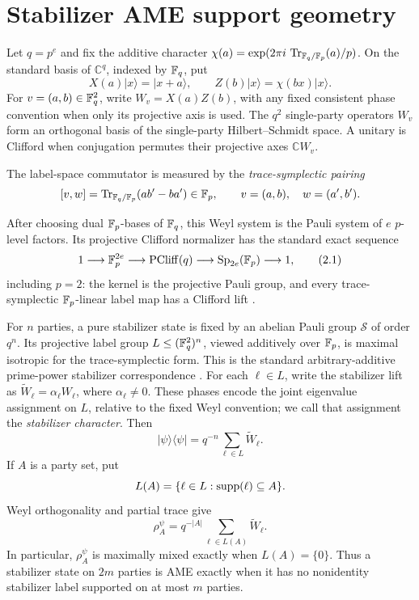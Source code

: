 \section{Stabilizer AME support geometry}\label{sec:dictionary}

Let \(q=p^e\) and fix the additive character
\(\chi(a)=\exp(2\pi i\,\operatorname{Tr}_{\mathbb F_q/\mathbb F_p}(a)/p)\).  On the standard basis of
\(\mathbb C^q\), indexed by \(\mathbb F_q\), put
\[
 X(a)\lvert x\rangle=\lvert x+a\rangle,\qquad
 Z(b)\lvert x\rangle=\chi(bx)\lvert x\rangle .
\]
For \(v=(a,b)\in\mathbb F_q^2\), write \(W_v=X(a)Z(b)\), with any fixed
consistent phase convention when only its projective axis is used.  The
\(q^2\) single-party operators \(W_v\) form an
orthogonal basis of the single-party Hilbert--Schmidt space.  A unitary is
Clifford when conjugation permutes their projective axes
\(\mathbb C W_v\).

The label-space commutator is measured by the \emph{trace-symplectic
pairing}
\[
 [v,w]=\operatorname{Tr}_{\mathbb F_q/\mathbb F_p}(ab'-ba')\in\mathbb F_p,
 \qquad v=(a,b),\quad w=(a',b').
\]

After choosing dual \(\mathbb F_p\)-bases of \(\mathbb F_q\), this Weyl system is the
Pauli system of \(e\) \(p\)-level factors.  Its projective Clifford
normalizer has the standard exact sequence
\[
 1\longrightarrow \mathbb F_p^{2e}\longrightarrow
 \operatorname{PCliff}(q)\longrightarrow
 \operatorname{Sp}_{2e}(\mathbb F_p)\longrightarrow1,          \tag{2.1}
\]
including \(p=2\): the kernel is the projective Pauli group, and every
trace-symplectic \(\mathbb F_p\)-linear label map has a Clifford lift
\cite{DehaeneDeMoor2003,HostensDehaeneDeMoor2005}.

For \(n\) parties, a pure stabilizer state is fixed by an abelian Pauli
group \(\mathcal S\) of order \(q^n\).  Its projective label group
\(L\leq(\mathbb F_q^2)^n\), viewed additively over \(\mathbb F_p\), is maximal isotropic
for the trace-symplectic form.  This is the standard arbitrary-additive
prime-power stabilizer correspondence
\cite[Theorems~13 and 15]{KetkarKlappeneckerKumarSarvepalli2006}.
For each \(\ell\in L\), write the stabilizer lift as
\(\widetilde W_\ell=\alpha_\ell W_\ell\), where
\(\alpha_\ell\ne0\).  These phases encode the joint eigenvalue assignment
on \(L\), relative to the fixed Weyl convention; we call that assignment the
\emph{stabilizer character}.  Then
\[
 \lvert\psi\rangle\langle\psi\rvert
   =q^{-n}\sum_{\ell\in L}\widetilde W_\ell .           \tag{2.2}
\]
If \(A\) is a party set, put
\[
 L(A)=\{\ell\in L:\operatorname{supp}(\ell)\subseteq A\}.
\]
Weyl orthogonality and partial trace give
\[
 \rho^\psi_A=q^{-|A|}\sum_{\ell\in L(A)}\widetilde W_\ell .  \tag{2.3}
\]
In particular, \(\rho^\psi_A\) is maximally mixed exactly when
\(L(A)=\{0\}\).  Thus a stabilizer state on \(2m\) parties is AME exactly
when it has no nonidentity stabilizer label supported on at most \(m\)
parties.

